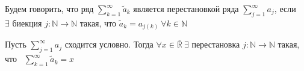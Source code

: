 \documentclass[11pt]{article}
\begin{document}
\begin{definition}
  Будем говорить, что ряд $\displaystyle \sum_{k = 1}^{\infty} 
  \widetilde{a}_k$ является перестановкой ряда $\displaystyle 
  \sum_{j = 1}^{\infty} a_j$, если \\ $\exists$ биекция $j \colon \mathbb{N} 
  \to \mathbb{N}$ такая, что $\widetilde{a}_k = a_{j(k)} \ \forall k \in 
  \mathbb{N}$
\end{definition}

\begin{theorem}[Риман]
  Пусть $\displaystyle \sum_{j = 1}^{\infty} a_j$ сходится условно. Тогда 
  $\forall x \in \overline{\mathbb{R}} \ \exists$ перестановка $j \colon 
  \mathbb{N} \to \mathbb{N}$ такая, что \ $\displaystyle 
  \sum_{k = 1}^{\infty} \widetilde{a}_k = x$  
\end{theorem}
\end{document}

